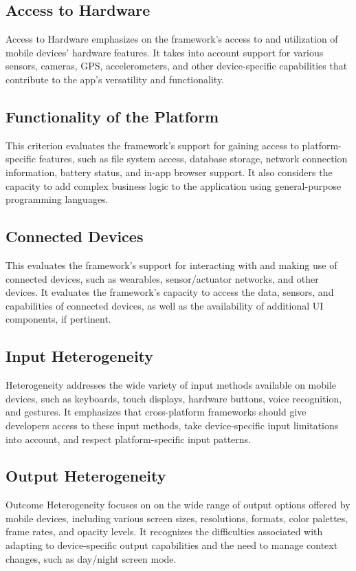 \subsection{Access to Hardware}
Access to Hardware emphasizes on the framework's access to and utilization of mobile devices' hardware features. It takes into account support for various sensors, cameras, GPS, accelerometers, and other device-specific capabilities that contribute to the app's versatility and functionality.

\subsection{Functionality of the Platform}
This criterion evaluates the framework's support for gaining access to platform-specific features, such as file system access, database storage, network connection information, battery status, and in-app browser support. It also considers the capacity to add complex business logic to the application using general-purpose programming languages.

\subsection{Connected Devices}
This evaluates the framework's support for interacting with and making use of connected devices, such as wearables, sensor/actuator networks, and other devices. It evaluates the framework's capacity to access the data, sensors, and capabilities of connected devices, as well as the availability of additional UI components, if pertinent.

\subsection{Input Heterogeneity}
Heterogeneity addresses the wide variety of input methods available on mobile devices, such as keyboards, touch displays, hardware buttons, voice recognition, and gestures. It emphasizes that cross-platform frameworks should give developers access to these input methods, take device-specific input limitations into account, and respect platform-specific input patterns.

\subsection{Output Heterogeneity}
Outcome Heterogeneity focuses on on the wide range of output options offered by mobile devices, including various screen sizes, resolutions, formats, color palettes, frame rates, and opacity levels. It recognizes the difficulties associated with adapting to device-specific output capabilities and the need to manage context changes, such as day/night screen mode.


